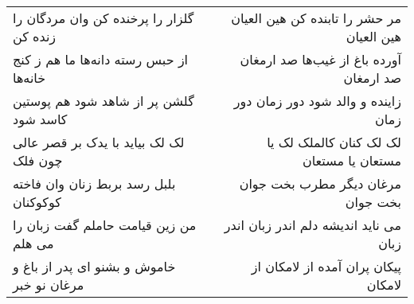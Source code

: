 \begin{center}
\begin{longtable}{l p{0.5cm} r}
\\
گلزار را پرخنده کن وان مردگان را زنده کن
&&
مر حشر را تابنده کن هین العیان هین العیان
\\
از حبس رسته دانه‌ها ما هم ز کنج خانه‌ها
&&
آورده باغ از غیب‌ها صد ارمغان صد ارمغان
\\
گلشن پر از شاهد شود هم پوستین کاسد شود
&&
زاینده و والد شود دور زمان دور زمان
\\
لک لک بیاید با یدک بر قصر عالی چون فلک
&&
لک لک کنان کالملک لک یا مستعان یا مستعان
\\
بلبل رسد بربط زنان وان فاخته کوکوکنان
&&
مرغان دیگر مطرب بخت جوان بخت جوان
\\
من زین قیامت حاملم گفت زبان را می هلم
&&
می ناید اندیشه دلم اندر زبان اندر زبان
\\
خاموش و بشنو ای پدر از باغ و مرغان نو خبر
&&
پیکان پران آمده از لامکان از لامکان
\\
\end{longtable}
\end{center}
